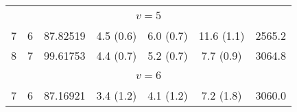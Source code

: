 \begin{table*}[htp]
\begin{tabular}{ccccccc}
&\vspace{-0.75em}\\
\multicolumn{7}{c}{$v = 5$} \\
\vspace{-0.75em}\\
 7 & 6 & 87.82519 & 4.5 (0.6) & 6.0 (0.7) & 11.6 (1.1) & 2565.2 \\
 8 & 7 & 99.61753 & 4.4 (0.7) & 5.2 (0.7) & 7.7 (0.9) & 3064.8 \\
\hline
&\vspace{-0.75em}\\
\multicolumn{7}{c}{$v = 6$} \\
\vspace{-0.75em}\\
 7 & 6 & 87.16921 & 3.4 (1.2) & 4.1 (1.2) & 7.2 (1.8) & 3060.0 \\
\end{tabular}

\par 
\end{table*}
